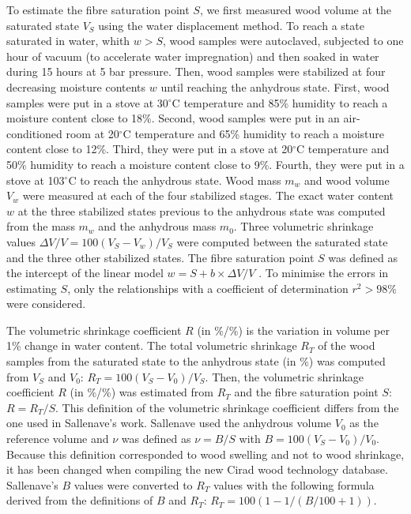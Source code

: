 \documentclass[a4paper, 12pt, leqno, dvipsnames]{article}\usepackage[]{graphicx}\usepackage[]{color}
\begin{document}
To estimate the fibre saturation point $S$, we first measured wood volume at the saturated state $V_S$ using the water displacement method. To reach a state saturated in water, whith $w>S$, wood samples were autoclaved, subjected to one hour of vacuum (to accelerate water impregnation) and then soaked in water during 15 hours at 5 bar pressure. Then, wood samples were stabilized at four decreasing moisture contents $w$ until reaching the anhydrous state. First, wood samples were put in a stove at 30$^\circ$C temperature and 85\% humidity to reach a moisture content close to 18\%. Second, wood samples were put in an air-conditioned room at 20$^\circ$C temperature and 65\% humidity to reach a moisture content close to 12\%. Third, they were put in a stove at 20$^\circ$C temperature and 50\% humidity to reach a moisture content close to 9\%. Fourth, they were put in a stove at 103$^\circ$C to reach the anhydrous state. Wood mass $m_w$ and wood volume $V_w$ were measured at each of the four stabilized stages. The exact water content $w$ at the three stabilized states previous to the anhydrous state was computed from the mass $m_w$ and the anhydrous mass $m_0$. Three volumetric shrinkage values $\Delta{V}/V = 100(V_S-V_w)/V_S$ were computed between the saturated state and the three other stabilized states. The fibre saturation point $S$ was defined as the intercept of the linear model $w = S + b \times \Delta{V}/V$ \citep{Stamm1964}. To minimise the errors in estimating $S$, only the relationships with a coefficient of determination $r^2 > 98\%$ were considered.

The volumetric shrinkage coefficient $R$ (in \%/\%) is the variation in volume per 1\% change in water content. The total volumetric shrinkage $R_T$ of the wood samples from the saturated state to the anhydrous state (in \%) was computed from $V_S$ and $V_0$: $R_T=100(V_S-V_0)/V_S$. Then, the volumetric shrinkage coefficient $R$ (in \%/\%) was estimated from $R_T$ and the fibre saturation point $S$: $R=R_T/S$. This definition of the volumetric shrinkage coefficient differs from the one used in Sallenave's work. Sallenave used the anhydrous volume $V_0$ as the reference volume and $\nu$ was defined as $\nu=B/S$ with $B=100(V_S-V_0)/V_0$. Because this definition corresponded to wood swelling and not to wood shrinkage, it has been changed when compiling the new Cirad wood technology database. Sallenave's $B$ values were converted to $R_T$ values with the following formula derived from the definitions of $B$ and $R_T$: $R_T=100(1-1/(B/100+1))$. 
\end{document}
